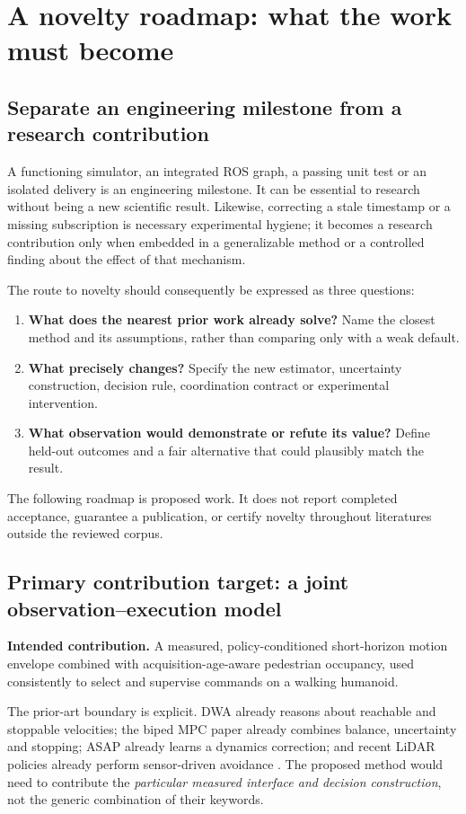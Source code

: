 \section{A novelty roadmap: what the work must become}
\label{sec:novelty-roadmap}

\subsection{Separate an engineering milestone from a research contribution}
A functioning simulator, an integrated ROS graph, a passing unit test or an
isolated delivery is an engineering milestone. It can be essential to research
without being a new scientific result. Likewise, correcting a stale timestamp
or a missing subscription is necessary experimental hygiene; it becomes a
research contribution only when embedded in a generalizable method or a
controlled finding about the effect of that mechanism.

The route to novelty should consequently be expressed as three questions:
\begin{enumerate}
\item \textbf{What does the nearest prior work already solve?} Name the closest
method and its assumptions, rather than comparing only with a weak default.
\item \textbf{What precisely changes?} Specify the new estimator, uncertainty
construction, decision rule, coordination contract or experimental intervention.
\item \textbf{What observation would demonstrate or refute its value?} Define
held-out outcomes and a fair alternative that could plausibly match the result.
\end{enumerate}
The following roadmap is proposed work. It does not report completed acceptance,
guarantee a publication, or certify novelty throughout literatures outside the
reviewed corpus.

\subsection{Primary contribution target: a joint observation--execution model}
\label{goal:primary}
\textbf{Intended contribution.} A measured, policy-conditioned short-horizon
motion envelope combined with acquisition-age-aware pedestrian occupancy, used
consistently to select and supervise commands on a walking humanoid.

The prior-art boundary is explicit. DWA already reasons about reachable and
stoppable velocities; the biped MPC paper already combines balance, uncertainty
and stopping; ASAP already learns a dynamics correction; and recent LiDAR policies
already perform sensor-driven avoidance \citep{dwa,biped2016,asap,safehumanoid,omni}.
The proposed method would need to contribute the \emph{particular measured
interface and decision construction}, not the generic combination of their keywords.

